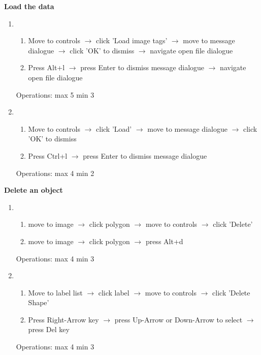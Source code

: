 \documentclass[a4paper,11pt,oneside]{article}
\begin{document}
{\bf Load the data}
\begin{enumerate}
    \item
    \begin{enumerate}
        \item Move to controls $\rightarrow$ click 'Load image tags' $\rightarrow$ move to message dialogue $\rightarrow$ click 'OK' to dismiss $\rightarrow$ navigate open file dialogue
        \item Press Alt+l $\rightarrow$ press Enter to dismiss message dialogue $\rightarrow$ navigate open file dialogue
    \end{enumerate}
    Operations: max 5 min 3
    \item
    \begin{enumerate}
        \item Move to controls $\rightarrow$ click 'Load' $\rightarrow$ move to message dialogue $\rightarrow$ click 'OK' to dismiss
        \item Press Ctrl+l $\rightarrow$ press Enter to dismiss message dialogue
    \end{enumerate}
    Operations: max 4 min 2
\end{enumerate}

{\bf Delete an object}
\begin{enumerate}
    \item
    \begin{enumerate}
        \item move to image $\rightarrow$ click polygon $\rightarrow$ move to controls $\rightarrow$ click 'Delete'
        \item move to image $\rightarrow$ click polygon $\rightarrow$ press Alt+d
    \end{enumerate}
    Operations: max 4 min 3
    \item
    \begin{enumerate}
        \item Move to label list $\rightarrow$ click label $\rightarrow$ move to controls $\rightarrow$ click 'Delete Shape'
        \item Press Right-Arrow key $\rightarrow$ press Up-Arrow or Down-Arrow to select $\rightarrow$ press Del key
    \end{enumerate}
    Operations: max 4 min 3
\end{enumerate}
\end{document}
